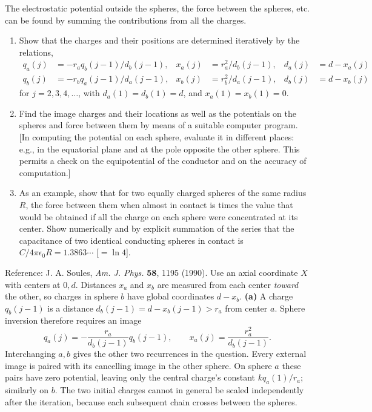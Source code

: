 The electrostatic potential outside the spheres, the force between the spheres, etc. can be found by summing the contributions from all the charges.
\begin{enumerate}
\item[(a)] Show that the charges and their positions are determined iteratively by the relations,
\begin{align*}
q_{a}(j)&=-r_{a}q_{b}(j-1)/d_{b}(j-1), & x_{a}(j)&=r_{a}^{2}/d_{b}(j-1), & d_{a}(j)&=d-x_{a}(j)\\
q_{b}(j)&=-r_{b}q_{a}(j-1)/d_{a}(j-1), & x_{b}(j)&=r_{b}^{2}/d_{a}(j-1), & d_{b}(j)&=d-x_{b}(j)
\end{align*}
for $j=2,3,4,\ldots$, with $d_{a}(1)=d_{b}(1)=d$, and $x_{a}(1)=x_{b}(1)=0$.
\item[(b)] Find the image charges and their locations as well as the potentials on the spheres and force between them by means of a suitable computer program. [In computing the potential on each sphere, evaluate it in different places: e.g., in the equatorial plane and at the pole opposite the other sphere. This permits a check on the equipotential of the conductor and on the accuracy of computation.]
\item[(c)] As an example, show that for two equally charged spheres of the same radius $R$, the force between them when almost in contact is  times the value that would be obtained if all the charge on each sphere were concentrated at its center. Show numerically and by explicit summation of the series that the capacitance of two identical conducting spheres in contact is $C/4\pi\epsilon_{0}R=1.3863\cdots$ [$=\ln4$].
\end{enumerate}
Reference: J. A. Soules, \emph{Am. J. Phys.} \textbf{58}, 1195 (1990).
\solution
Use an axial coordinate $X$ with centers at $0,d$. Distances $x_a$
and $x_b$ are measured from each center \emph{toward} the other, so
charges in sphere $b$ have global coordinates $d-x_b$.
\textbf{(a)} A charge $q_b(j-1)$ is a distance
$d_b(j-1)=d-x_b(j-1)>r_a$ from center $a$. Sphere inversion therefore
requires an image
\[
q_a(j)=-\frac{r_a}{d_b(j-1)}q_b(j-1),\qquad
x_a(j)=\frac{r_a^2}{d_b(j-1)}.
\]
Interchanging $a,b$ gives the other two recurrences in the question.
Every external image is paired with its cancelling image in the
other sphere. On sphere $a$ these pairs have zero potential, leaving
only the central charge's constant $kq_a(1)/r_a$; similarly on $b$.
The two initial charges cannot in general be scaled independently
after the iteration, because each subsequent chain crosses between
the spheres.

